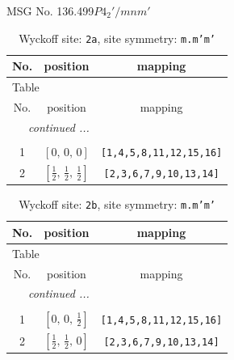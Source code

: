 \documentclass[fleqn,8pt]{jsarticle}
\begin{document}
\setcounter{MaxMatrixCols}{32}

\renewcommand{\tablename}{Table~}
\renewcommand{\figurename}{Figure~}
\begin{center}
\LARGE
MSG No. 136.499\quad$P4_{2}'/mnm'$
\end{center}
\renewcommand{\arraystretch}{1.2}
\begin{longtable}{ccc}
\caption{Wyckoff site: {\tt 2a}, site symmetry: {\tt m.m'm'}}
 \\
 \hline \hline
No. & position & mapping \\ \hline \endfirsthead

\multicolumn{2}{l}{\tablename\ \thetable{}} \\
 \hline \hline
No. & position & mapping \\ \hline \endhead

 \hline \hline
\multicolumn{2}{r}{\footnotesize\it continued ...} \\ \endfoot

 \hline \hline
\multicolumn{2}{r}{} \\ \endlastfoot

1 & $\left[ 0,\, 0,\, 0 \right]$ & {\tt [1,4,5,8,11,12,15,16]} \\ \hline
2 & $\left[ \frac{1}{2},\, \frac{1}{2},\, \frac{1}{2} \right]$ & {\tt [2,3,6,7,9,10,13,14]} \\
\end{longtable}
\renewcommand{\arraystretch}{1.2}
\begin{longtable}{ccc}
\caption{Wyckoff site: {\tt 2b}, site symmetry: {\tt m.m'm'}}
 \\
 \hline \hline
No. & position & mapping \\ \hline \endfirsthead

\multicolumn{2}{l}{\tablename\ \thetable{}} \\
 \hline \hline
No. & position & mapping \\ \hline \endhead

 \hline \hline
\multicolumn{2}{r}{\footnotesize\it continued ...} \\ \endfoot

 \hline \hline
\multicolumn{2}{r}{} \\ \endlastfoot

1 & $\left[ 0,\, 0,\, \frac{1}{2} \right]$ & {\tt [1,4,5,8,11,12,15,16]} \\ \hline
2 & $\left[ \frac{1}{2},\, \frac{1}{2},\, 0 \right]$ & {\tt [2,3,6,7,9,10,13,14]} \\
\end{longtable}
\end{document}
